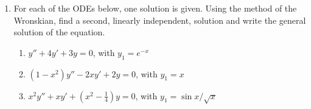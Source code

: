 \documentclass[fleqn]{article}
\begin{document}
\begin{enumerate}
    \item  For each of the ODEs below, one solution is given. Using the method of the Wronskian, find a second, linearly independent, solution and write the general solution of the equation. 
      \begin{enumerate}
      \item $y'' + 4 y' + 3 y =0 $, with $y_1= e^{-x}$

      \item $(1-x^2) y'' - 2 x y' + 2y=0 $, with $y_1= x $

      \item  $x^2 y'' + x y' + (x^2 - \frac{1}{4})y=0 $, with $y_1=\sin x/\sqrt{x} $
      \end{enumerate}


  \end{enumerate}
\end{document}
